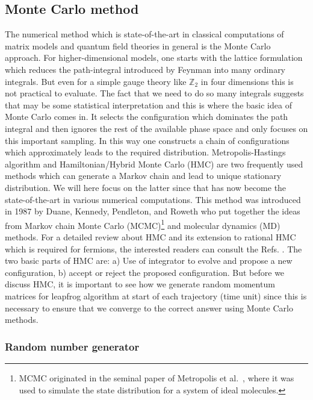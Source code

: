 \documentclass[11pt]{article}
\begin{document}
\subsection{Monte Carlo method}
The numerical method which is state-of-the-art in classical computations 
of matrix models and quantum field theories in general is the Monte Carlo approach.
For higher-dimensional models, one starts with the lattice formulation which reduces the 
path-integral introduced by Feynman into many ordinary integrals. But even for a simple
gauge theory like $\mathbb{Z}_{2}$ in four dimensions this is not practical to evaluate. 
The fact that we need to do so many integrals suggests that may be some statistical 
interpretation and this is where the basic idea of Monte Carlo comes in. It selects the 
configuration which dominates the path integral and then ignores the rest of the available
phase space and only focuses on this important sampling. In this way one constructs a chain of configurations 
which approximately leads to the required distribution. 
Metropolis-Hastings algorithm and Hamiltonian/Hybrid Monte Carlo (HMC) 
are two frequently used methods which 
can generate a Markov chain and lead to unique stationary distribution. 
We will here focus on the latter since that has now become the state-of-the-art in 
various numerical computations. This method was introduced in 
1987 by Duane, Kennedy, Pendleton, and Roweth \cite{Duane:1987de} who put together the ideas from
Markov chain Monte Carlo (MCMC)\footnote{MCMC originated in the seminal paper of 
Metropolis et al.~\cite{Metropolis:1953am}, where it was used to simulate the state distribution for a system of ideal molecules.} 
and molecular dynamics (MD) methods. 
For a detailed review about HMC and its extension to rational 
HMC which is required for fermions, the interested readers 
can consult the Refs. \cite{Hanada:2018fnp,Joseph:2019zer}. 
The two basic parts of HMC are: 
a) Use of integrator to evolve and propose a new configuration, b) accept or reject
the proposed configuration. But before we discuss HMC, 
it is important to see how we generate random momentum 
matrices for leapfrog algorithm 
at start of each trajectory (time unit) since 
this is necessary to ensure that we converge to the 
correct answer using Monte Carlo methods. 


\subsubsection{Random number generator}  
\end{document}
